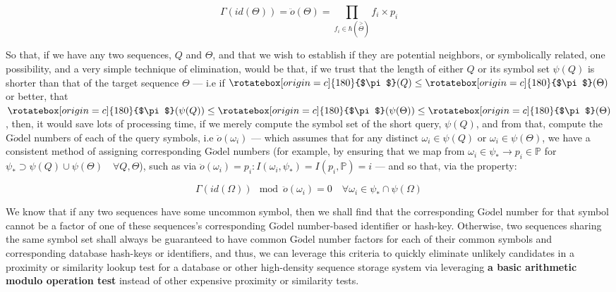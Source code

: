 \documentclass[a4paper, 18pt]{book} %
\newcommand{\invpi}{\rotatebox[origin=c]{180}{$\pi$}}
\begin{document}
 \vspace{1em}
\begin{equation}
\label{EQHASHKEYSEQGODEL}
 \Gamma (id(\Theta)) = \ddot{o}(\Theta) = \prod\limits_{f_i \in \hbar(\overset{>}{\Theta})} f_i \times p_i
\end{equation}
\vspace{1em}

So that, if we have any two sequences, $Q$ and $\Theta$, and that we wish to establish if they are potential neighbors, or symbolically related, one possibility, and a very simple technique of elimination, would be that, if we trust that the length of either $Q$ or its symbol set $\psi(Q)$ is shorter than that of the target sequence $\Theta$ --- i.e if $\invpi(Q) \leq \invpi(\Theta)$ or better, that $\invpi(\psi(Q)) \leq \invpi(\psi(\Theta)) \leq \invpi(\Theta)$, then, it would save lots of processing time, if we merely compute the symbol set of the short query, $\psi(Q)$, and from that, compute the G$\ddot{o}$del numbers of each of the query symbols, i.e $\ddot{o}(\omega_i)$ --- which assumes that for any distinct $\omega_i \in \psi(Q)$ or $\omega_i \in \psi(\Theta)$, we have a consistent method of assigning corresponding G$\ddot{o}$del numbers (for example, by ensuring that we map from $\omega_i \in \psi_* \rightarrow p_i \in \mathbb{P}$ for $\psi_* \supset \psi(Q) \cup \psi(\Theta) \quad \forall Q, \Theta$), such as via $\ddot{o}(\omega_i) = p_i : I(\omega_i, \psi_*) = I(p_i, \mathbb{P})= i$ --- and so that, via the property:


  \vspace{1em}
\begin{equation}
\label{EQHASHKEYSEQGODELTEST}
 \Gamma (id(\Omega)) \mod \ddot{o}(\omega_i) = 0 \quad \forall \omega_i \in \psi_* \cap \psi(\Omega)
\end{equation}
\vspace{1em}

We know that if any two sequences have some uncommon symbol, then we shall find that the corresponding G$\ddot{o}$del number for that symbol cannot be a factor of one of these sequences's corresponding G$\ddot{o}$del number-based identifier or hash-key. Otherwise, two sequences sharing the same symbol set shall always be guaranteed to have common G$\ddot{o}$del number factors for each of their common symbols and corresponding database hash-keys or identifiers, and thus, we can leverage this criteria to quickly eliminate unlikely candidates in a proximity or similarity lookup test for a database or other high-density sequence storage system via leveraging \textbf{a basic arithmetic modulo operation test} instead of other expensive proximity or similarity tests.
 
\end{document}
